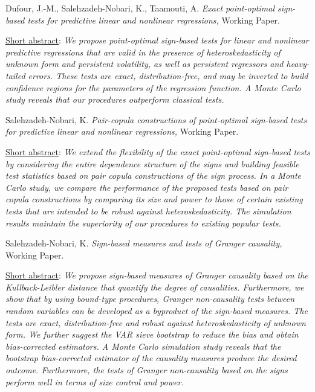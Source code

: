 \documentclass[margin,line,pifont,palatino,courier]{res}
\begin{document}
\begin{resume}
Dufour, J.-M., Salehzadeh-Nobari, K., Taamouti, A. \emph{Exact point-optimal sign-based tests for predictive linear and nonlinear regressions,} Working Paper.

\underline{Short abstract}: \emph{We propose point-optimal sign-based tests for linear and nonlinear predictive regressions that are valid in the presence of heteroskedasticity of unknown form and persistent volatility, as well as persistent
regressors and heavy-tailed errors. These tests are exact, distribution-free, and may be inverted to
build confidence regions for the parameters of the regression function. A Monte Carlo study reveals
that our procedures outperform classical tests.}

Salehzadeh-Nobari, K. \emph{Pair-copula constructions of point-optimal sign-based tests for predictive linear and nonlinear regressions,} Working Paper.

\underline{Short abstract}: \emph{We extend the flexibility of the exact point-optimal sign-based tests by considering the entire dependence structure of the signs and building feasible test statistics based on pair copula constructions of the sign process. In a Monte Carlo study, we compare the performance of the proposed tests based on pair copula constructions by comparing its size and power to those of certain existing tests that are intended to be robust against heteroskedasticity. The simulation results maintain the superiority of our procedures to existing popular tests.}

\vspace{+4ex}
Salehzadeh-Nobari, K. \emph{Sign-based measures and tests of Granger causality,} Working Paper.

\underline{Short abstract}:  \emph{We propose sign-based measures of Granger causality based on the Kullback-Leibler distance that quantify the degree of causalities. Furthermore, we show that by using bound-type procedures, Granger non-causality tests between random variables can be developed as a byproduct of the sign-based measures. The tests are exact, distribution-free and robust against heteroskedasticity of unknown form. We further suggest the VAR sieve bootstrap to reduce the bias and obtain bias-corrected estimators. A Monte Carlo simulation study reveals that the bootstrap bias-corrected estimator of the causality measures produce the desired outcome. Furthermore, the tests of Granger non-causality based on the signs perform well in terms of size control and power.}

\hrulefill


\end{resume}
\end{document}
